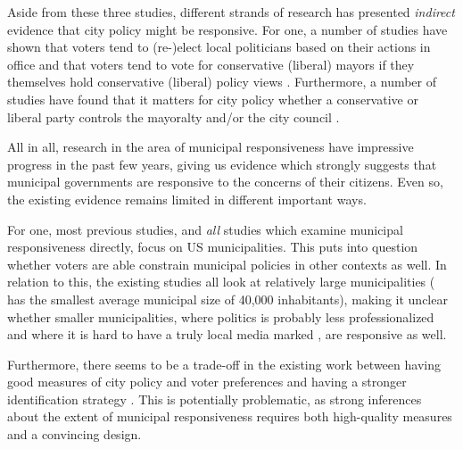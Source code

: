 \documentclass[a4paper,12pt]{article}
\begin{document}
Aside from these three studies, different strands of research has presented \textit{indirect} evidence that city policy might be responsive. For one, a number of studies have shown that voters tend to (re-)elect local politicians based on their actions in office \citep{arnold2012holding,burnett2017politics} and that voters tend to vote for conservative (liberal)  mayors if they themselves hold conservative (liberal) policy views  \citep{sances2017ideology,boudreau2015lost,hopkins2017retrospective}. Furthermore, a number of studies have found that it matters for city policy whether a conservative or liberal party controls the mayoralty and/or the city council \citep{fiva2016power,folke2014shades,blom2006parties,de2016mayoral}. 


All in all, research in the area of municipal responsiveness have impressive progress in the past few years, giving us evidence which strongly suggests that municipal governments are responsive to the concerns of their citizens. Even so, the existing evidence remains limited in different important ways.

For one, most previous studies, and \textit{all} studies which examine municipal responsiveness directly, focus on US municipalities. This puts into question whether voters are able constrain municipal policies in other contexts as well. In relation to this, the existing studies all look at relatively large municipalities (\citealp{einstein2016pushing} has the smallest average municipal size of 40,000 inhabitants), making it unclear whether smaller municipalities, where politics is probably less professionalized \cite{lewis2011size} and where it is hard to have a truly local media marked \cite{snyder2010press}, are responsive as well.

Furthermore, there seems to be a trade-off in the existing work between having good measures of city policy and voter preferences \citep[cf.][]{tausanovitch2014representation} and having a stronger identification strategy \citep[cf.][]{sances2017voters}. This is potentially problematic, as strong inferences about the extent of municipal responsiveness requires both high-quality measures and a convincing design.
\end{document}
